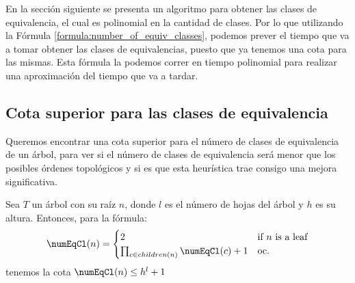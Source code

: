 
En la sección siguiente se presenta un algoritmo para obtener las clases de equivalencia, el cual es polinomial en la cantidad de clases. Por lo que utilizando la Fórmula \ref{formula:number_of_equiv_classes}, podemos prever el tiempo que va a tomar obtener las clases de equivalencias, puesto que ya tenemos una cota para las mismas. Esta fórmula la podemos correr en tiempo polinomial para realizar una aproximación del tiempo que va a tardar. %
\begin{comment}
    Hay un caso que no estamos considerando, y es cuando los nodos no relacionados tienen ancestros. Pero ese es el mismo caso para el cual \emph{no pudimos encontrar una respuesta} en el conteo de los ordenes topológicos. En este caso, sería fácil solucionarlo, ya que solo necesitarías conectar $r_0$ a la nueva raíz del subárbol. El problema surge si el subárbol tiene múltiples raíces, entonces la fórmula que definimos anteriormente no sería suficiente, porque estaría contando algunos escenarios dos veces.    
    Al final no lo agregué, no suma tanto. 
\end{comment}

\subsection{Cota superior para las clases de equivalencia}

Queremos encontrar una cota superior para el número de clases de equivalencia de un árbol, para ver si el número de clases de equivalencia será menor que los posibles órdenes topológicos y si es que esta heurística trae consigo una mejora significativa. 

\begin{lemma}\label{lemma:upper_bound_equivalence_classes}
    Sea  $T$ un árbol con su raíz $n$, donde $l$ es el número de hojas del árbol y $h$ es su altura. Entonces, para la fórmula: 
    \[
    \numEqCl(n) = 
    \begin{cases} 
    2 & \text{if $n$ is a leaf} \\
    \prod_{c \in children(n)} \numEqCl(c) + 1 & \text{oc.}
    \end{cases}
    \]
    tenemos la cota $\numEqCl(n) \leq h^l + 1$
      
\end{lemma}

